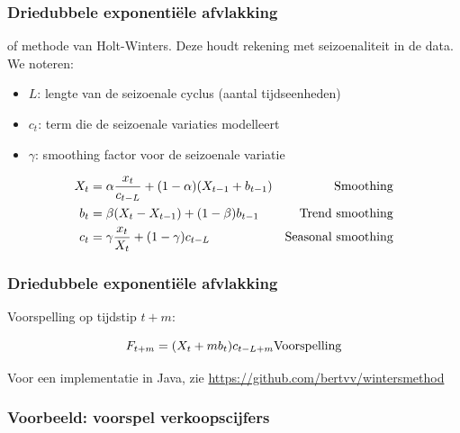 \documentclass[aspectratio=169]{beamer}
\begin{document}
\begin{frame}
  \frametitle{Driedubbele exponentiële afvlakking}

  of methode van Holt-Winters. Deze houdt rekening met seizoenaliteit in de data. We noteren:

  \begin{itemize}
    \item $L$: lengte van de seizoenale cyclus (aantal tijdseenheden)
    \item $c_t$: term die de seizoenale variaties modelleert
    \item $\gamma$: smoothing factor voor de seizoenale variatie
  \end{itemize}

\begin{align*}
	X_{t} &= \alpha \frac{x_{t}}{c_{t-L}} + (1-\alpha) (X_{t-1} + b_{t-1}) & \textnormal{Smoothing}\\
	b_{t} &= \beta (X_{t} - X_{t-1}) + (1-\beta)b_{t-1} & \textnormal{Trend smoothing} \\
	c_{t} &= \gamma \frac{x_{t}}{X_{t}} + (1-\gamma)c_{t-L} & \textnormal{Seasonal smoothing} \\
\label{eq:HoltWinters}
\end{align*}

\end{frame}

\begin{frame}
  \frametitle{Driedubbele exponentiële afvlakking}

  Voorspelling op tijdstip $t + m$:

  \[ F_{t+m} = (X_{t} + mb_{t})c_{t-L+m}  \textnormal{Voorspelling}\]

  Voor een implementatie in Java, zie \url{https://github.com/bertvv/wintersmethod}
\end{frame}

\begin{frame}
  \frametitle{Voorbeeld: voorspel verkoopscijfers}

  \centering
\end{frame}
\end{document}
